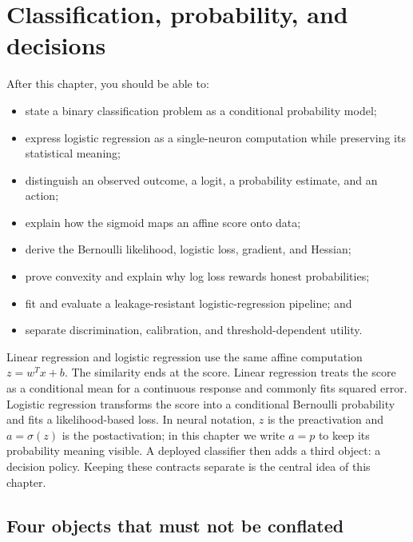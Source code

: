 \chapter{Classification, probability, and decisions}
\label{ch:classification}

\begin{learningobjectives}
After this chapter, you should be able to:
\begin{itemize}
  \item state a binary classification problem as a conditional probability model;
  \item express logistic regression as a single-neuron computation while
  preserving its statistical meaning;
  \item distinguish an observed outcome, a logit, a probability estimate, and an action;
  \item explain how the sigmoid maps an affine score onto data;
  \item derive the Bernoulli likelihood, logistic loss, gradient, and Hessian;
  \item prove convexity and explain why log loss rewards honest probabilities;
  \item fit and evaluate a leakage-resistant logistic-regression pipeline; and
  \item separate discrimination, calibration, and threshold-dependent utility.
\end{itemize}
\end{learningobjectives}

\begin{chapterconnection}
Linear regression and logistic regression use the same affine computation
$z=w^Tx+b$. The similarity ends at the score. Linear regression treats the
score as a conditional mean for a continuous response and commonly fits squared
error. Logistic regression transforms the score into a conditional Bernoulli
probability and fits a likelihood-based loss. In neural notation, $z$ is the
preactivation and $a=\sigma(z)$ is the postactivation; in this chapter we write
$a=p$ to keep its probability meaning visible. A deployed classifier then adds
a third object: a decision policy. Keeping these contracts separate is the
central idea of this chapter.
\end{chapterconnection}

\section{Four objects that must not be conflated}

